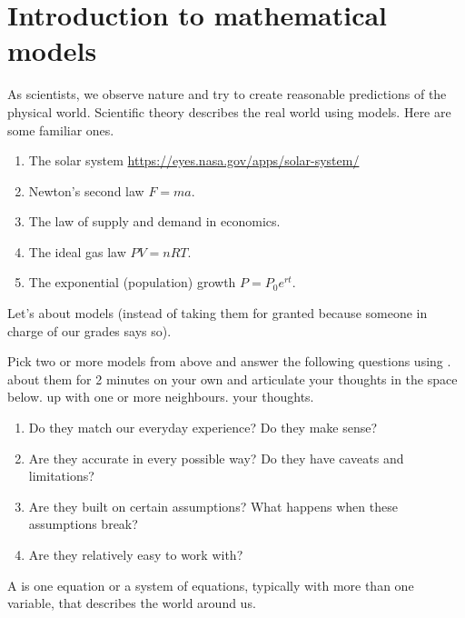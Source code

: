 \documentclass[../main.tex]{subfiles}
\begin{document}
 \section{Introduction to mathematical models}
As scientists, we observe nature and try to create reasonable predictions of the physical world. Scientific theory describes the real world using models. Here are some familiar ones.

\begin{enumerate}
  \item The solar system \url{https://eyes.nasa.gov/apps/solar-system/}
  \item Newton's second law \(F = ma\).
  \item The law of supply and demand in economics.
  \item The ideal gas law \(PV = nRT\).
  \item The exponential (population) growth \(P = P_{0} e^{rt}\).
\end{enumerate}

Let's  about models (instead of taking them for granted because someone in charge of our grades says so).

\faComment{} Pick two or more models from above and answer the following questions using .  about them for 2 minutes on your own and articulate your thoughts in the space below.  up with one or more neighbours.  your thoughts.

\bigskip
\begin{enumerate}[wide]
  \item Do they match our everyday experience? Do they make sense?

  \item Are they accurate in every possible way?  Do they have caveats and limitations?

  \item Are they built on certain assumptions? What happens when these assumptions break?

  \item Are they relatively easy to work with? 
\end{enumerate}

\clearpage

\begin{definition} \label{def:models}
  A  is one equation or a system of equations, typically with more than one variable, that describes the world around us.
\end{definition}
\end{document}
